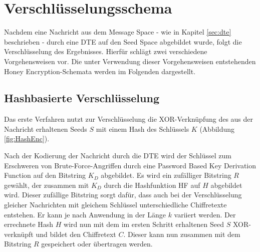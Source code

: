 \section{Verschlüsselungsschema}
\label{sec:schema}

Nachdem eine Nachricht aus dem Message Space - wie in Kapitel \ref{sec:dte} beschrieben - durch eine DTE auf den Seed Space abgebildet wurde, folgt die Verschlüsselung des Ergebnisses. Hierfür schlägt \cite{EURO2014} zwei verschiedene Vorgehensweisen vor. Die unter Verwendung dieser Vorgehensweisen entstehenden Honey Encryption-Schemata werden im Folgenden dargestellt.

\subsection{Hashbasierte Verschlüsselung}

Das erste Verfahren nutzt zur Verschlüsselung die XOR-Verknüpfung des aus der Nachricht erhaltenen Seeds \(S\) mit einem Hash des Schlüssels \(K\) (Abbildung \ref{fig:HashEnc}).  

Nach der Kodierung der Nachricht durch die DTE wird der Schlüssel zum Erschweren von Brute-Force-Angriffen durch eine Password Based Key Derivation Function auf den Bitstring \(K_D\) abgebildet. Es wird ein zufälliger Bitstring \(R\) gewählt, der zusammen mit \(K_D\) durch die Hashfunktion HF auf \(H\) abgebildet wird. Dieser zufällige Bitstring sorgt dafür, dass auch bei der Verschlüsselung gleicher Nachrichten mit gleichem Schlüssel unterschiedliche Chiffretexte entstehen. Er kann je nach Anwendung in der Länge \(k\) variiert werden. Der errechnete Hash \(H\) wird nun mit dem im ersten Schritt erhaltenen Seed \(S\) XOR-verknüpft und bildet den Chiffretext \(C\). Dieser kann nun zusammen mit dem Bitstring \(R\) gespeichert oder übertragen werden. 

